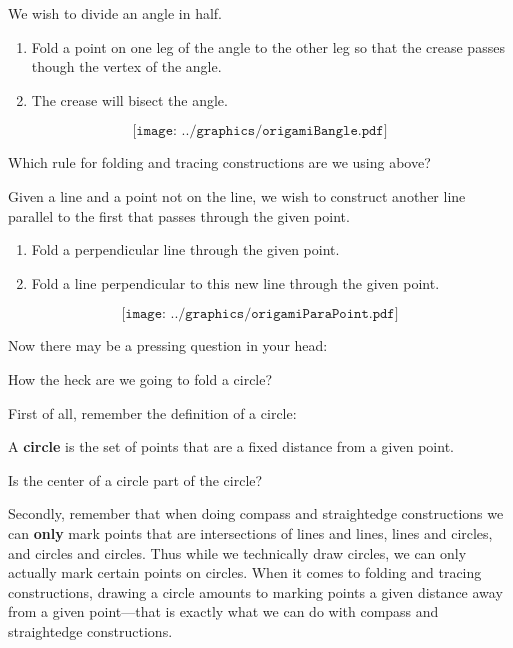 \begin{construction} 
We wish to divide an angle in half.
\begin{enumerate}
\item Fold a point on one leg of the angle to the other leg so that
  the crease passes though the vertex of the angle.
\item The crease will bisect the angle.
\end{enumerate}
\[
\texttt{[image: ../graphics/origamiBangle.pdf]}
\]
\end{construction}


\begin{question} Which rule for folding and tracing constructions are we using above?
\end{question}
\QM



\begin{construction} 
 Given a line and a point not on the line, we wish to construct another line parallel
 to the first that passes through the given point.
\begin{enumerate}
\item Fold a perpendicular line through the given point.
\item Fold a line perpendicular to this new line through the given
  point.
\end{enumerate}
\[
\texttt{[image: ../graphics/origamiParaPoint.pdf]}
\]
\end{construction}



Now there may be a pressing question in your head:

\begin{question} 
How the heck are we going to fold a circle?
\end{question}

First of all, remember the definition of a circle:

\begin{definition}
A \textbf{circle} is the set of points that are a fixed distance from
a given point.
\end{definition}

\begin{question} Is the center of a circle part of the circle?
\end{question}
\QM

Secondly, remember that when doing compass and straightedge
constructions we can \textbf{only} mark points that are intersections
of lines and lines, lines and circles, and circles and circles. Thus
while we technically draw circles, we can only actually mark certain
points on circles.  When it comes to folding and tracing constructions, drawing a
circle amounts to marking points a given distance away from a given
point---that is exactly what we can do with compass and straightedge
constructions.


